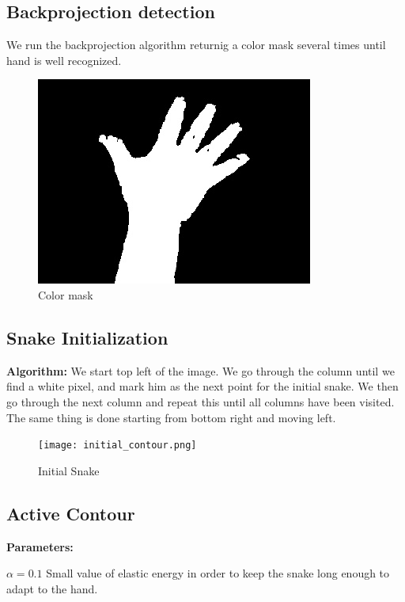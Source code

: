 \documentclass{report}
\begin{document}
\subsection*{Backprojection detection}

We run the backprojection algorithm returnig a color mask several times until hand is well recognized. 

\begin{figure}[H]
							\begin{center}
							\includegraphics[width=0.5\linewidth]{final.jpg}
              \caption*{Color mask}
							\end{center}
\end{figure}

\subsection*{Snake Initialization}

\textbf{Algorithm:} We start top left of the image. We go through the column until we find a white pixel, and mark him as the next point for the initial snake. We then go through the next column and repeat this until all columns have been visited. The same thing is done starting from bottom right and moving left. 

\begin{figure}[H]
							\begin{center}
							\texttt{[image: initial\_contour.png]}
              \caption*{Initial Snake}
							\end{center}
\end{figure}

\subsection*{Active Contour}

\textbf{Parameters:}

$ \alpha =0.1 $ Small value of elastic energy in order to keep the snake long enough to adapt to the hand. 
\end{document}

